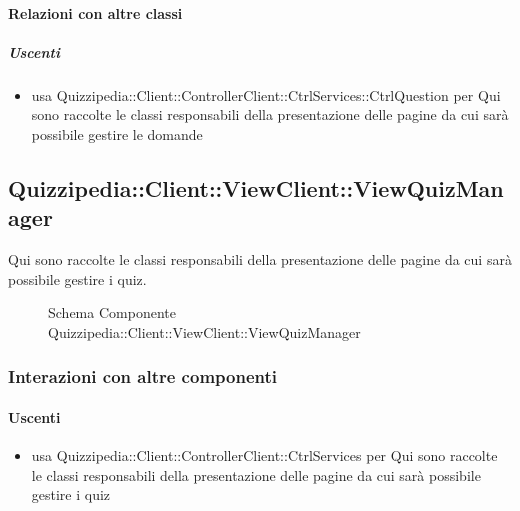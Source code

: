 \paragraph{Relazioni con altre classi}
\subparagraph{Uscenti}
\begin{itemize}
\item usa Quizzipedia::Client::ControllerClient::CtrlServices::CtrlQuestion per Qui sono raccolte le classi responsabili della presentazione delle pagine da cui sarà possibile gestire le domande
\end{itemize}
\subsection{Quizzipedia::Client::ViewClient::ViewQuizManager}
Qui sono raccolte le classi responsabili della presentazione delle pagine da cui sarà possibile gestire i quiz.
\begin{figure}[H]
\centering
\noindent{}
\caption[Schema Componente Quizzipedia::Client::ViewClient::ViewQuizManager]{Schema Componente Quizzipedia::Client::ViewClient::ViewQuizManager}
\end{figure}
\subsubsection{Interazioni con altre componenti}
\paragraph{Uscenti}
\begin{itemize}
\item usa Quizzipedia::Client::ControllerClient::CtrlServices per Qui sono raccolte le classi responsabili della presentazione delle pagine da cui sarà possibile gestire i quiz
\end{itemize}

